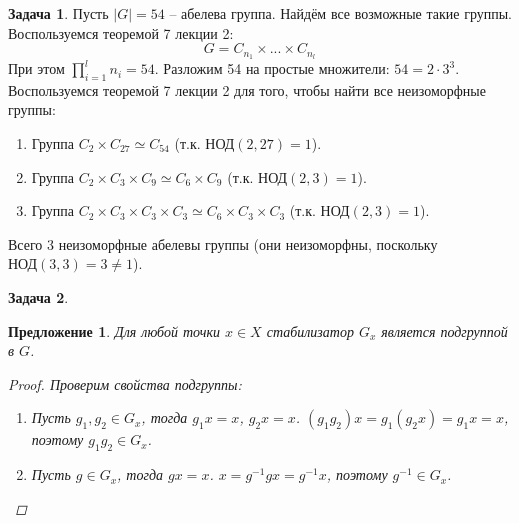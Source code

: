 \documentclass[12pt]{article}
\newtheorem{predl}[theorem]{Предложение}
\theoremstyle{definition}
\newtheorem{zad}{Задача}[section]
\begin{document}
\begin{zad}
Пусть $|G|=54$ -- абелева группа. Найдём все возможные такие группы. Воспользуемся теоремой 7 лекции 2:
\begin{equation}
    G=C_{n_1}\times...\times C_{n_l}
\end{equation}
При этом $\prod\limits_{i=1}^ln_i=54$. Разложим 54 на простые множители: $54=2\cdot 3^3$. Воспользуемся теоремой 7 лекции 2 для того, чтобы найти все неизоморфные группы:
\begin{enumerate}
    \item Группа $C_{2}\times C_{27}\simeq C_{54}$ (т.к. $\text{НОД}(2,27)=1$).
    \item Группа $C_{2}\times C_{3}\times C_9\simeq C_{6}\times C_9$ (т.к. $\text{НОД}(2, 3)=1$).
    \item Группа $C_{2}\times C_{3}\times C_3\times C_3\simeq C_{6}\times C_3\times C_3$ (т.к. $\text{НОД}(2, 3)=1$).
\end{enumerate}
Всего 3 неизоморфные абелевы группы (они неизоморфны, поскольку $\text{НОД}(3, 3)=3\neq 1$).
\end{zad}
\begin{zad}
\begin{predl}
Для любой точки $x\in X$ стабилизатор $G_x$ является подгруппой в $G$.
\begin{proof}
Проверим свойства подгруппы:
\begin{enumerate}
    \item Пусть $g_1, g_2\in G_x$, тогда $g_1x=x$, $g_2x=x$. $(g_1g_2)x=g_1(g_2x)=g_1x=x$, поэтому $g_1g_2\in G_x$.
    \item Пусть $g\in G_x$, тогда $gx=x$. $x=g^{-1}gx=g^{-1}x$, поэтому $g^{-1}\in G_x$.
\end{enumerate}
\end{proof}
\end{predl}
\end{zad}
\end{document}
